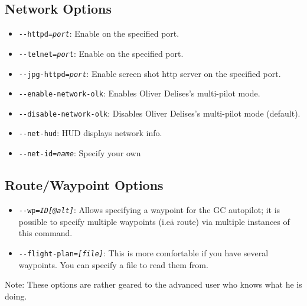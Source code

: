 \subsection{Network Options}
\begin{itemize}
\item{\texttt{-$ $-httpd={\it port}}}: Enable  on the specified port.
\item{\texttt{-$ $-telnet={\it port}}}: Enable  on the specified port.
\item{\texttt{-$ $-jpg-httpd={\it port}}}: Enable screen shot http server on the specified port.
\item{\texttt{-$ $-enable-network-olk}}: Enables Oliver Delises's multi-pilot mode.
\item{\texttt{-$ $-disable-network-olk}}: Disables Oliver Delises's multi-pilot mode (default).
\item{\texttt{-$ $-net-hud}}: HUD displays network info.
\item{\texttt{-$ $-net-id={\it name}}}: Specify your own 
 \end{itemize}
\subsection{Route/Waypoint Options}
\begin{itemize}
\item{\texttt{-$ $-wp={\it ID[@alt]}}}: Allows specifying a waypoint for the GC autopilot; it
is possible to specify multiple waypoints (i.e\. a route) via multiple instances of this
command.
\item{\texttt{-$ $-flight-plan={\it [file]}}}: This is more comfortable if
you have several waypoints. You can  specify a file to read them from.
\end{itemize}

Note: These options are rather geared to the advanced user who knows what he is doing. 

